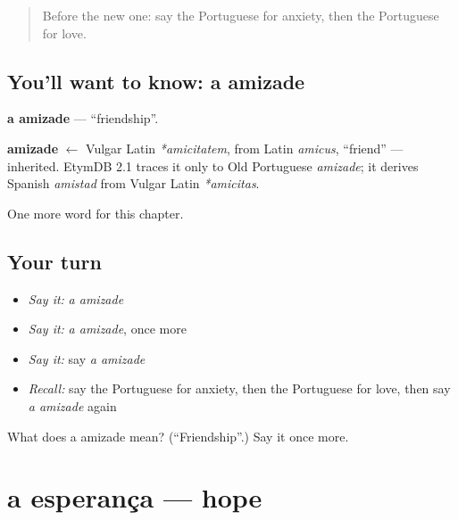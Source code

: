 \label{lesson:PT-C149-amizade}



\begin{quote}
Before the new one: say the Portuguese for anxiety, then the Portuguese for love.
\end{quote}

\subsection*{You'll want to know: a amizade}
\textbf{a amizade} — \textquotedblleft{}friendship\textquotedblright{}.

\begin{cousinweb}
\textbf{amizade} $\leftarrow$ Vulgar Latin \emph{*amicitatem}, from Latin \emph{amicus}, \textquotedblleft{}friend\textquotedblright{} — inherited. EtymDB 2.1 traces it only to Old Portuguese \emph{amizade}; it derives Spanish \emph{amistad} from Vulgar Latin \emph{*amicitas}.
\end{cousinweb}

\begin{grammarlens}[title={What you've built}]
One more word for this chapter.
\end{grammarlens}

\subsection*{Your turn}
\begin{itemize}
\raggedright
  \item \emph{Say it:} \emph{a amizade}
  \item \emph{Say it:} \emph{a amizade}, once more
  \item \emph{Say it:} say \emph{a amizade}
  \item \emph{Recall:} say the Portuguese for anxiety, then the Portuguese for love, then say \emph{a amizade} again
\end{itemize}

\begin{tcolorbox}[breakable,colback=teal!4,colframe=teal!35!black,title={Before you move on}]
What does a amizade mean? (\textquotedblleft{}Friendship\textquotedblright{}.) Say it once more.
\end{tcolorbox}
\section[a esperança]{a esperança — hope}

